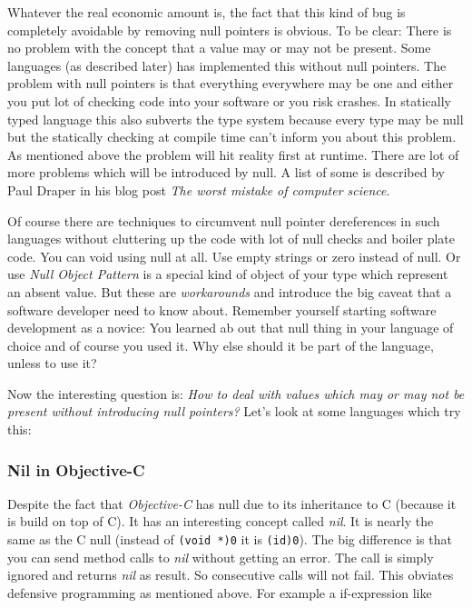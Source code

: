 \documentclass[12pt,a4paper]{report}
\begin{document}
Whatever the real economic amount is, the fact that this kind of bug is completely avoidable by removing null pointers is obvious. To be clear: There is no problem with the concept that a value may or may not be present. Some languages (as described later) has implemented this without null pointers. The problem with null pointers is that everything everywhere may be one and either you put lot of checking code into your software or you risk crashes. In statically typed language this also subverts the type system because every type may be null but the statically checking at compile time can't inform you about this problem. As mentioned above the problem will hit reality first at runtime. There are lot of more problems which will be introduced by null. A list of some is described by Paul Draper in his blog post \textit{The worst mistake of computer science}\cite{draper-worst-mistake-cs}.

Of course there are techniques to circumvent null pointer dereferences in such languages without cluttering up the code with lot of null checks and boiler plate code. You can void using null at all. Use empty strings or zero instead of null. Or use \textit{Null Object Pattern} is a special kind of object of your type which represent an absent value. But these are \textit{workarounds} and introduce the big caveat that a software developer need to know about. Remember yourself starting software development as a novice: You learned ab out that null thing in your language of choice and of course you used it. Why else should it be part of the language, unless to use it?

Now the interesting question is: \textit{How to deal with values which may or may not be present without introducing null pointers?} Let's look at some languages which try this:

\subsubsection{Nil in Objective-C}
Despite the fact that \textit{Objective-C} has null due to its inheritance to C (because it is build on top of C). It has an interesting concept called \textit{nil}. It is nearly the same as the C null (instead of \texttt{(void *)0} it is \texttt{(id)0}). The big difference is that you can send method calls to \textit{nil} without getting an error. The call is simply ignored and returns \textit{nil} as result. So consecutive calls will not fail. This obviates defensive programming as mentioned above. For example a if-expression like
\end{document}

